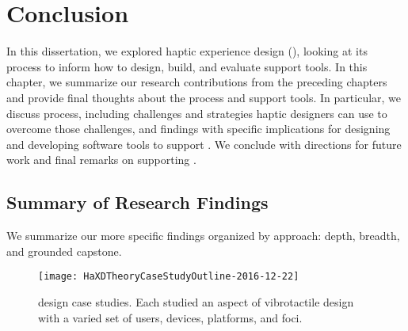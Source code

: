\chapter{Conclusion}
\label{ch:conclusion}
In this dissertation, we explored haptic experience design (\haxd), looking at its process to inform how to design, build, and evaluate \haxd support tools.
In this chapter, we summarize our research contributions from the preceding chapters and provide final thoughts about the \haxd process and support tools.
In particular, we discuss process, including challenges and strategies haptic designers can use to overcome those challenges, and
findings with specific implications for designing and developing software tools to support \haxd.
We conclude with directions for future work and final remarks on supporting \haxd.



%
%
\section{Summary of Research Findings}
We summarize our more specific findings organized by approach: depth, breadth, and grounded capstone.


\begin{figure}[htbp]
\begin{center}
\texttt{[image: HaXDTheoryCaseStudyOutline-2016-12-22]}
\caption{ design case studies. Each studied an aspect of vibrotactile design with a varied set of users, devices, platforms, and foci.}
\label{fig:intro:casestudyoverview}
\end{center}
\end{figure}



